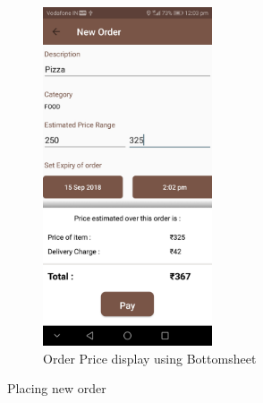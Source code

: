 \documentclass{report}
\begin{document}
\begin{figure}[h!]
\begin{subfigure}[h!]{.3\textwidth}
\includegraphics[width=5cm]{pay.jpg}
\caption{\centering Order Price display using Bottomsheet}
\end{subfigure}
\caption{Placing new order} 
\label{fig:NASA_Logo}
\end{figure}
\end{document}
